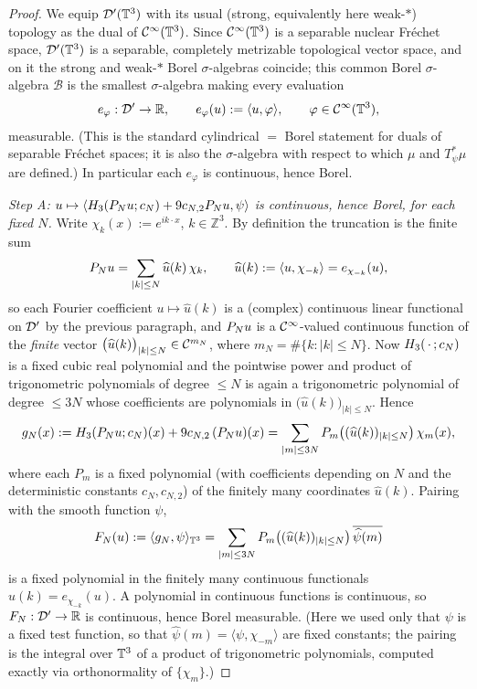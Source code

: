 \begin{proof}
We equip $\mathcal{D}'(\mathbb{T}^3)$ with its usual (strong, equivalently here weak-$*$)
topology as the dual of $\mathcal{C}^\infty(\mathbb{T}^3)$. Since $\mathcal{C}^\infty(\mathbb{T}^3)$ is a
separable nuclear Fr\'echet space, $\mathcal{D}'(\mathbb{T}^3)$ is a separable, completely
metrizable topological vector space, and on it the strong and weak-$*$ Borel
$\sigma$-algebras coincide; this common Borel $\sigma$-algebra $\mathcal B$ is the
smallest $\sigma$-algebra making every evaluation
\[
e_\varphi:\mathcal{D}'\to\mathbb{R},\qquad e_\varphi(u):=\langle u,\varphi\rangle,\qquad \varphi\in\mathcal{C}^\infty(\mathbb{T}^3),
\]
measurable. (This is the standard cylindrical $=$ Borel statement for duals of
separable Fr\'echet spaces; it is also the $\sigma$-algebra with respect to which
$\mu$ and $T_\psi^*\mu$ are defined.) In particular each $e_\varphi$ is continuous,
hence Borel.

\emph{Step A: $u\mapsto\langle H_3(P_N u;c_N)+9c_{N,2}P_N u,\psi\rangle$ is
continuous, hence Borel, for each fixed $N$.}
Write $\chi_k(x):=e^{ik\cdot x}$, $k\in\mathbb{Z}^3$. By definition the truncation is the
finite sum
\[
P_N u=\sum_{|k|\le N}\widehat u(k)\,\chi_k,\qquad \widehat u(k):=\langle u,\chi_{-k}\rangle=e_{\chi_{-k}}(u),
\]
so each Fourier coefficient $u\mapsto\widehat u(k)$ is a (complex) continuous
linear functional on $\mathcal{D}'$ by the previous paragraph, and $P_N u$ is a
$\mathcal{C}^\infty$-valued continuous function of the \emph{finite} vector
$\bigl(\widehat u(k)\bigr)_{|k|\le N}\in\mathcal{C}^{m_N}$, where $m_N=\#\{k:|k|\le N\}$.
Now $H_3(\,\cdot\,;c_N)$ is a fixed cubic real polynomial and the pointwise
power and product of trigonometric polynomials of degree $\le N$ is again a
trigonometric polynomial of degree $\le 3N$ whose coefficients are polynomials in
$\bigl(\widehat u(k)\bigr)_{|k|\le N}$. Hence
\[
g_N(x):=H_3(P_N u;c_N)(x)+9c_{N,2}\,(P_N u)(x)
=\sum_{|m|\le 3N}P_m\bigl((\widehat u(k))_{|k|\le N}\bigr)\,\chi_m(x),
\]
where each $P_m$ is a fixed polynomial (with coefficients depending on $N$ and the
deterministic constants $c_N,c_{N,2}$) of the finitely many coordinates
$\widehat u(k)$. Pairing with the smooth function $\psi$,
\[
F_N(u):=\langle g_N,\psi\rangle_{\mathbb{T}^3}
=\sum_{|m|\le 3N}P_m\bigl((\widehat u(k))_{|k|\le N}\bigr)\,\overline{\widehat\psi(m)}
\]
is a fixed polynomial in the finitely many continuous functionals
$\widehat u(k)=e_{\chi_{-k}}(u)$. A polynomial in continuous functions is
continuous, so $F_N:\mathcal{D}'\to\mathbb{R}$ is continuous, hence Borel measurable. (Here we
used only that $\psi$ is a fixed test function, so that
$\widehat\psi(m)=\langle\psi,\chi_{-m}\rangle$ are fixed constants; the pairing is
the integral over $\mathbb{T}^3$ of a product of trigonometric polynomials, computed
exactly via orthonormality of $\{\chi_m\}$.)


\end{proof}

